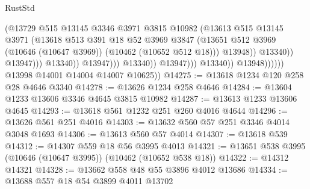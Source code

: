 \begin{lexlean}{RustStd}
\begin{coremodule}
                                                    (@13729
                                                      @515
                                                      @13145
                                                      @3346
                                                      @3971
                                                      @3815
                                                      @10982
                                                      (@13613
                                                        @515
                                                        @13145
                                                        @3971
                                                        (@13618
                                                          @513
                                                          @391
                                                          @18
                                                          @52
                                                          @3969
                                                          @3847
                                                          (@13651
                                                            @512
                                                            @3969
                                                            (@10646 (@10647 @3969))
                                                            (@10462 (@10652 @512 @18)))
                                                          @13948))
                                                      @13340))
                                                  @13947)))
                                            @13340))
                                        @13947)))
                                  @13340))
                              @13947)))
                        @13340))
                    @13948))))))
        @13998
        @14001
        @14004
        @14007
        @10625))
@14275 := @13618 @1234 @120 @258 @28 @4646 @3340
@14278 := @13626 @1234 @258 @4646
@14284 := @13604 @1233 @13606 @3346 @4645 @3815 @10982
@14287 := @13613 @1233 @13606 @4645
@14293 := @13618 @561 @1232 @251 @260 @4016 @4644
@14296 := @13626 @561 @251 @4016
@14303 := @13632 @560 @57 @251 @3346 @4014 @3048 @1693
@14306 := @13613 @560 @57 @4014
@14307 := @13618 @539
@14312 := @14307 @559 @18 @56 @3995 @4013
@14321 := @13651 @538 @3995 (@10646 (@10647 @3995)) (@10462 (@10652 @538 @18))
@14322 := @14312 @14321
@14328 := @13662 @558 @48 @55 @3896 @4012 @13686
@14334 := @13688 @557 @18 @54 @3899 @4011 @13702

\end{coremodule}
\end{lexlean}

